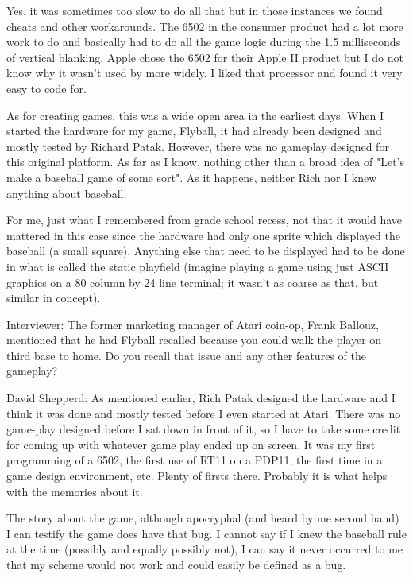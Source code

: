 Yes, it was sometimes too slow to do all that but in those instances we found cheats and other workarounds. The 6502 in the consumer product had a lot more work to do and basically had to do all the game logic during the 1.5 milliseconds of vertical blanking. Apple chose the 6502 for their Apple II product but I do not know why it wasn't used by more widely. I liked that processor and found it very easy to code for.

As for creating games, this was a wide open area in the earliest days. When I started the hardware for my game, Flyball, it had already been designed and mostly tested by Richard Patak. However, there was no gameplay designed for this original platform. As far as I know, nothing other than a broad idea of "Let's make a baseball game of some sort". As it happens, neither Rich nor I knew anything about baseball. 

For me, just what I remembered from grade school recess, not that it would have mattered in this case since the hardware had only one sprite which displayed the baseball (a small square). Anything else that need to be displayed had to be done in what is called the static playfield (imagine playing a game using just ASCII graphics on a 80 column by 24 line terminal; it wasn't as coarse as that, but similar in concept).

\textcolor{interviewer}{Interviewer:} The former marketing manager of Atari coin-op, Frank Ballouz, mentioned that he had Flyball recalled because you could walk the player on third base to home. Do you recall that issue and any other features of the gameplay?

\textcolor{interviewee}{David Shepperd:} As mentioned earlier, Rich Patak designed the hardware and I think it was done and mostly tested before I even started at Atari. There was no game-play designed before I sat down in front of it, so I have to take some credit for coming up with whatever game play ended up on screen. It was my first programming of a 6502, the first use of RT11 on a PDP11, the first time in a game design environment, etc. Plenty of firsts there. Probably it is what helps with the memories about it. 

The story about the game, although apocryphal (and heard by me second hand) I can testify the game does have that bug. I cannot say if I knew the baseball rule at the time (possibly and equally possibly not), I can say it never occurred to me that my scheme would not work and could easily be defined as a bug. 

